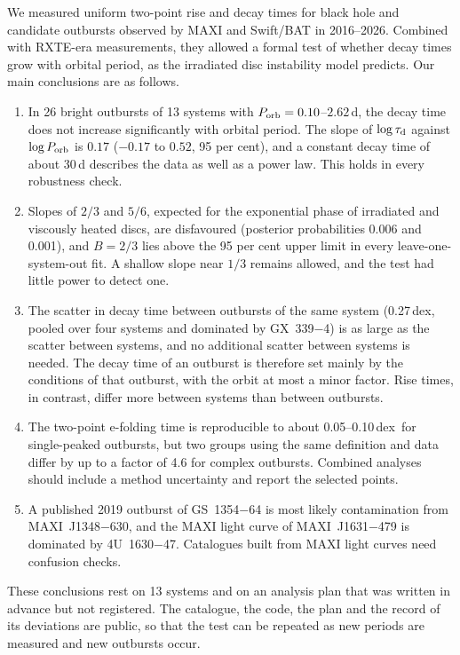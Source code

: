 \documentclass[fleqn,usenatbib]{mnras}
\newcommand{\taud}{\tau_{\rm d}}
\newcommand{\porb}{P_{\rm orb}}
\newcommand{\dex}{\,dex}
\begin{document}
We measured uniform two-point rise and decay times for black hole and candidate outbursts observed by MAXI and Swift/BAT in 2016--2026. Combined with RXTE-era measurements, they allowed a formal test of whether decay times grow with orbital period, as the irradiated disc instability model predicts. Our main conclusions are as follows.
\begin{enumerate}
\item In 26 bright outbursts of 13 systems with $\porb=0.10$--$2.62$\,d, the decay time does not increase significantly with orbital period. The slope of $\log\taud$ against $\log\porb$ is $0.17$ ($-0.17$ to $0.52$, 95 per cent), and a constant decay time of about 30\,d describes the data as well as a power law. This holds in every robustness check.
\item Slopes of $2/3$ and $5/6$, expected for the exponential phase of irradiated and viscously heated discs, are disfavoured (posterior probabilities 0.006 and 0.001), and $B=2/3$ lies above the 95 per cent upper limit in every leave-one-system-out fit. A shallow slope near $1/3$ remains allowed, and the test had little power to detect one.
\item The scatter in decay time between outbursts of the same system (0.27\dex, pooled over four systems and dominated by GX~339$-$4) is as large as the scatter between systems, and no additional scatter between systems is needed. The decay time of an outburst is therefore set mainly by the conditions of that outburst, with the orbit at most a minor factor. Rise times, in contrast, differ more between systems than between outbursts.
\item The two-point e-folding time is reproducible to about 0.05--0.10\dex\ for single-peaked outbursts, but two groups using the same definition and data differ by up to a factor of 4.6 for complex outbursts. Combined analyses should include a method uncertainty and report the selected points.
\item A published 2019 outburst of GS~1354$-$64 is most likely contamination from MAXI~J1348$-$630, and the MAXI light curve of MAXI~J1631$-$479 is dominated by 4U~1630$-$47. Catalogues built from MAXI light curves need confusion checks.
\end{enumerate}
These conclusions rest on 13 systems and on an analysis plan that was written in advance but not registered. The catalogue, the code, the plan and the record of its deviations are public, so that the test can be repeated as new periods are measured and new outbursts occur.
\end{document}
